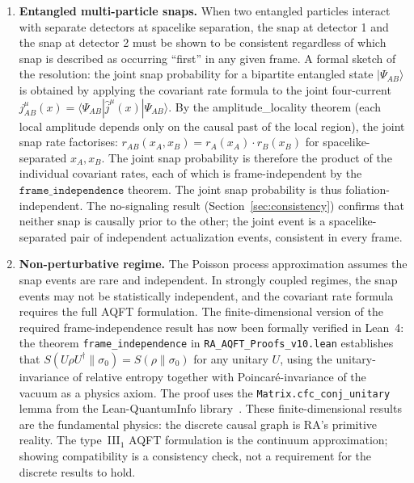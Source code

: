 \documentclass[11pt,a4paper]{article}
\theoremstyle{plain}
\theoremstyle{definition}
\theoremstyle{remark}
\begin{document}
\begin{enumerate}[leftmargin=*]
  \item \textbf{Entangled multi-particle snaps.} When two entangled particles
  interact with separate detectors at spacelike separation, the snap at detector 1
  and the snap at detector 2 must be shown to be consistent regardless of which
  snap is described as occurring ``first'' in any given frame.
  A formal sketch of the resolution: the joint snap probability for a
  bipartite entangled state $|\Psi_{AB}\rangle$ is obtained by applying
  the covariant rate formula to the joint four-current
  $j^\mu_{AB}(x) = \langle \Psi_{AB}|\hat{j}^\mu(x)|\Psi_{AB}\rangle$.
  By the amplitude\_locality theorem (each local amplitude depends only on
  the causal past of the local region), the joint snap rate factorises:
  $r_{AB}(x_A, x_B) = r_A(x_A) \cdot r_B(x_B)$ for spacelike-separated
  $x_A, x_B$. The joint snap probability is therefore the product of the
  individual covariant rates, each of which is frame-independent by the
  $\texttt{frame\_independence}$ theorem. The joint snap probability is thus
  foliation-independent. The no-signaling result
  (Section~\ref{sec:consistency}) confirms that neither snap is causally
  prior to the other; the joint event is a spacelike-separated pair of
  independent actualization events, consistent in every frame.

  \item \textbf{Non-perturbative regime.} The Poisson process approximation
  assumes the snap events are rare and independent. In strongly coupled regimes,
  the snap events may not be statistically independent, and the covariant rate
  formula requires the full AQFT formulation. The finite-dimensional version of
  the required frame-independence result has now been formally verified in
  Lean~4: the theorem \texttt{frame\_independence} in
  \texttt{RA\_AQFT\_Proofs\_v10.lean} establishes that
  $S(U\rho U^\dagger \| \sigma_0) = S(\rho \| \sigma_0)$ for any unitary $U$,
  using the unitary-invariance of relative entropy together with
  Poincar\'{e}-invariance of the vacuum as a physics axiom. The proof uses the
  \texttt{Matrix.cfc\_conj\_unitary} lemma from the Lean-QuantumInfo
  library~\citep{Meiburg2025LQI}. These finite-dimensional results are
  the fundamental physics: the discrete causal graph is RA's primitive
  reality. The type~III$_1$ AQFT formulation is the continuum
  approximation; showing compatibility is a consistency check, not a
  requirement for the discrete results to hold.
\end{enumerate}
\end{document}
